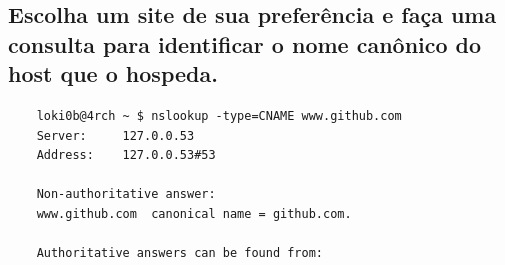 \begin{parts}
    \part{Escolha um site de sua preferência e faça uma consulta para identificar o nome canônico do host que o hospeda.}
    \begin{solution}
    \begin{verbatim}
    loki0b@4rch ~ $ nslookup -type=CNAME www.github.com
    Server:		127.0.0.53
    Address:	127.0.0.53#53

    Non-authoritative answer:
    www.github.com	canonical name = github.com.

    Authoritative answers can be found from:
    \end{verbatim}
\end{solution}
\end{parts}